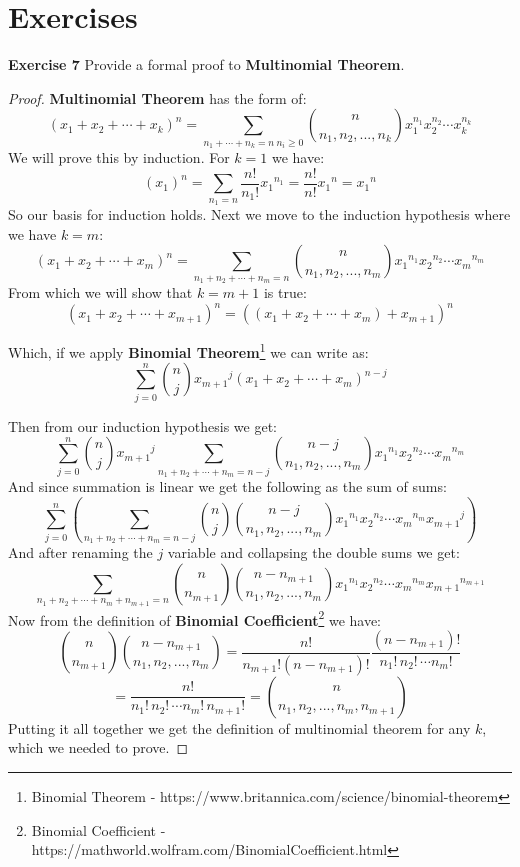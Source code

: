 \documentclass[a4paper]{article}
\begin{document}
\section{Exercises}
\noindent \textbf{Exercise 7}  Provide a formal proof to \textbf{Multinomial Theorem}.
\begin{proof}
\textbf{Multinomial Theorem} has the form of:\
$$(x_1 + x_2 + \cdots + x_k)^n = \sum_{n_1+\cdots +n_k = n\ n_i \geq 0}^{} \binom{n}{n_1, n_2, ..., n_k}x_{1}^{n_{1}}x_{2}^{n_{2}}\cdots x_{k}^{n_{k}}$$
We will prove this by induction. For $k=1$ we have:
$$(x_1)^n = \sum_{n_1 = n} \frac{n!}{n_1!} {x_1}^{n_1} =  \frac{n!}{n!} {x_1}^{n} = {x_1}^{n}$$
So our basis for induction holds. Next we move to the induction hypothesis where we have $k=m$:
$$(x_1 + x_2 + \cdots + x_m)^n = \sum_{n_1 + n_2 + \cdots \mathop + n_m = n} \binom{n}{n_1, n_2, ..., n_m} {x_1}^{n_1} {x_2}^{n_2} \cdots {x_m}^{n_m}$$
From which we will show that $k=m+1$ is true:
$$(x_1 + x_2 + \cdots + x_{m+1})^n = ((x_1 + x_2 + \cdots + x_m) + x_{m+1})^n$$
\begin{samepage}
Which, if we apply \textbf{Binomial Theorem}\footnote{Binomial Theorem - https://www.britannica.com/science/binomial-theorem} we can write as:
$$\sum_{j = 0}^{n} \binom{n}{j} {x_{m+ 1} }^j (x_1 + x_2 + \cdots + x_m)^{n - j}$$
\end{samepage}
Then from our induction hypothesis we get:
$$\sum_{j = 0}^{n} \binom{n}{j} {x_{m + 1} }^j \sum_{n_1 + n_2 + \cdots + n_m = n - j} \binom{n - j}{n_1, n_2, ..., n_m} {x_1}^{n_1} {x_2}^{n_2} \cdots {x_m}^{n_m}$$
And since summation is linear we get the following as the sum of sums:
$$\sum_{j = 0}^{n} \left(\sum_{n_1 + n_2 + \cdots + n_m = n - j} \binom{n}{j} \binom{n - j}{n_1, n_2, ..., n_m} {x_1}^{n_1} {x_2}^{n_2} \cdots {x_m}^{n_m} {x_{m + 1} }^j \right)$$
And after renaming the $j$ variable and collapsing the double sums we get:
$$\sum_{n_1 + n_2 + \cdots + n_m + n_{m + 1} = n} \binom{n}{n_{m + 1} } \binom{n - n_{m + 1}}{n_1, n_2, ..., n_m} {x_1}^{n_1} {x_2}^{n_2} \cdots {x_m}^{n_m} {x_{m + 1} }^{n_{m + 1} }$$
Now from the definition of \textbf{Binomial Coefficient}\footnote{Binomial Coefficient - https://mathworld.wolfram.com/BinomialCoefficient.html} we have:
$$\binom{n}{n_{m + 1} } \binom{n - n_{m + 1} } {n_1, n_2, ..., n_m} = \frac{n!}{n_{m + 1}! (n - n_{m + 1} )!} \frac{(n - n_{m + 1} )!} {n_1! \, n_2! \, \cdots n_m!}$$
$$= \frac{n!}{n_1! \, n_2! \, \cdots n_m! \, n_{m + 1}!} = \binom{n}{n_1, n_2, ..., n_m, n_{m + 1}}$$
Putting it all together we get the definition of multinomial theorem for any $k$, which we needed to prove.
\end{proof}
\end{document}
